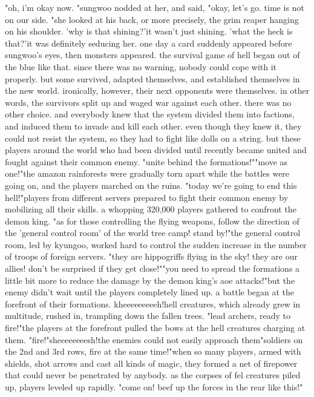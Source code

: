 "oh, i'm okay now.
"sungwoo nodded at her, and said, "okay, let's go.
 time is not on our side.
"she looked at his back, or more precisely, the grim reaper hanging on his shoulder.
'why is that shining?'it wasn't just shining.
'what the heck is that?'it was definitely seducing her.
one day a card suddenly appeared before sungwoo's eyes, then monsters appeared.
the survival game of hell began out of the blue like that.
since there was no warning, nobody could cope with it properly.
but some survived, adapted themselves, and established themselves in the new world.
ironically, however, their next opponents were themselves.
in other words, the survivors split up and waged war against each other.
there was no other choice.
 and everybody knew that the system divided them into factions, and induced them to invade and kill each other.
 even though they knew it, they could not resist the system, so they had to fight like dolls on a string.
but these players around the world who had been divided until recently became united and fought against their common enemy.
"unite behind the formations!""move as one!"the amazon rainforests were gradually torn apart while the battles were going on, and the players marched on the ruins.
"today we're going to end this hell!"players from different servers prepared to fight their common enemy by mobilizing all their skills.
 a whopping 320,000 players gathered to confront the demon king.
"as for those controlling the flying weapons, follow the direction of the 'general control room' of the world tree camp! stand by!"the general control room, led by kyungoo, worked hard to control the sudden increase in the number of troops of foreign servers.
"they are hippogriffs flying in the sky! they are our allies! don't be surprised if they get close!""you need to spread the formations a little bit more to reduce the damage by the demon king's aoe attacks!"but the enemy didn't wait until the players completely lined up.
 a battle began at the forefront of their formations.
kheeeeeeeeeh!hell creatures, which already grew in multitude, rushed in, trampling down the fallen trees.
"lead archers, ready to fire!"the players at the forefront pulled the bows at the hell creatures charging at them.
"fire!"sheeeeeeeesh!the enemies could not easily approach them"soldiers on the 2nd and 3rd rows, fire at the same time!"when so many players, armed with shields, shot arrows and cast all kinds of magic, they formed a net of firepower that could never be penetrated by anybody.
as the corpses of fel creatures piled up, players leveled up rapidly.
"come on! beef up the forces in the rear like this!"

